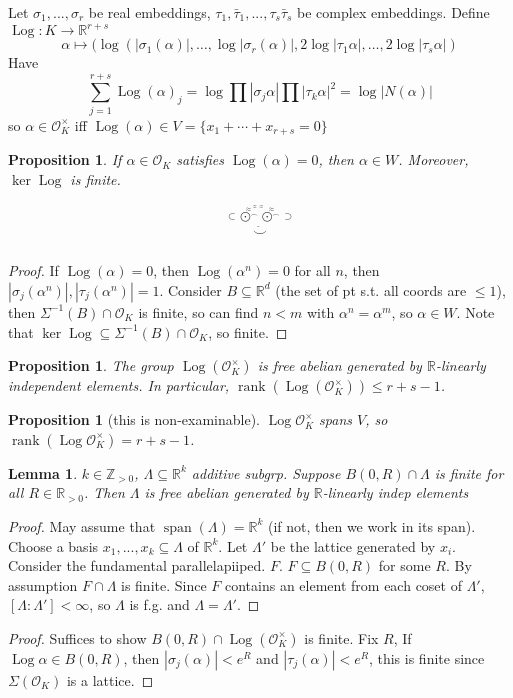 \documentclass{article}
\theoremstyle{definition}
\theoremstyle{remark}
\theoremstyle{plain}
\newtheorem{lem}[defn]{Lemma}
\newtheorem{prop}[defn]{Proposition}
\newcommand{\ZZ}{\mathbb{Z}}
\newcommand{\RR}{\mathbb{R}}
\begin{document}
Let $\sigma_1,...,\sigma_r$ be real embeddings, $\tau_1,\bar\tau_1,...,\tau_s\bar\tau_s$ be complex embeddings. \newcommand{\Log}{\operatorname{Log}}
Define $\Log:K\to\RR^{r+s}$
\[\alpha\mapsto(\log(|\sigma_1(\alpha)|,\ldots,\log|\sigma_r(\alpha)|,2\log|\tau_1\alpha|,\ldots,2\log|\tau_s\alpha|)\]
Have
\[\sum_{j=1}^{r+s}\Log(\alpha)_j=\log\prod|\sigma_j\alpha|\prod|\tau_k\alpha|^2=\log|N(\alpha)|\]
so $\alpha\in\mathcal O_K^\times$ iff $\Log(\alpha)\in V= \{x_1+\cdots+x_{r+s}=0\}$
\begin{prop}
    If $\alpha\in\mathcal O_K$ satisfies $\Log(\alpha)=0$, then $\alpha\in W$. Moreover, $\ker\Log$ is finite.
\end{prop}
\[\overset{\overset{\approx^{\approx\approx}\approx}{\subset\overset{\smallfrown}{\bigodot}\overset{\smallfrown}{\bigodot}\supset}}{\overset{\hat{}}{\smile}}\tag{We are late}\]
\begin{proof}
    If $\Log(\alpha)=0$, then $\Log(\alpha^n)=0$ for all $n$, then $|\sigma_j(\alpha^n)|,|\tau_j(\alpha^n)|=1$. Consider $B\subseteq\RR^d$ (the set of pt s.t. all coords are $\le 1$), then $\Sigma^{-1}(B)\cap \mathcal O_K$ is finite, so can find $n<m$ with $\alpha^n=\alpha^m$, so $\alpha\in W$. Note that $\ker\Log\subseteq\Sigma^{-1}(B)\cap \mathcal O_K$, so finite.
\end{proof}
\begin{prop}
    The group $\Log(\mathcal O_K^\times)$ is free abelian generated by $\RR$-linearly independent elements. In particular, $\operatorname{rank}(\Log(\mathcal O_K^\times))\le r+s-1$.
\end{prop}
\begin{prop}[this is non-examinable]
    $\Log\mathcal O_K^\times$ spans $V$, so $\operatorname{rank}(\Log\mathcal O_K^\times)=r+s-1$.
\end{prop}

\begin{lem}
    $k\in\ZZ_{>0}$, $\Lambda\subseteq\RR^k$ additive subgrp. Suppose $B(0,R)\cap\Lambda$ is finite for all $R\in\RR_{>0}$. Then $\Lambda$ is free abelian generated by $\RR$-linearly indep elements
\end{lem}
\begin{proof}
    May assume that $\operatorname{span}(\Lambda)=\RR^k$ (if not, then we work in its span). Choose a basis $x_1,...,x_k\subseteq\Lambda$ of $\RR^k$. Let $\Lambda'$ be the lattice generated by $x_i$. Consider the fundamental parallelapiiped. $F$. $F\subseteq B(0,R)$ for some $R$. By assumption $F\cap \Lambda$ is finite. Since $F$ contains an element from each coset of $\Lambda'$, $[\Lambda:\Lambda']<\infty$, so $\Lambda$ is f.g. and $\Lambda=\Lambda'$.
\end{proof}
\begin{proof}
    Suffices to show $B(0,R)\cap \Log(\mathcal O_K^\times)$ is finite. Fix $R$, If $\Log\alpha\in B(0,R)$, then $|\sigma_j(\alpha)|<e^R$ and $|\tau_j(\alpha)|<e^R$, this is finite since $\Sigma(\mathcal O_K)$ is a lattice.
\end{proof}
\end{document}
